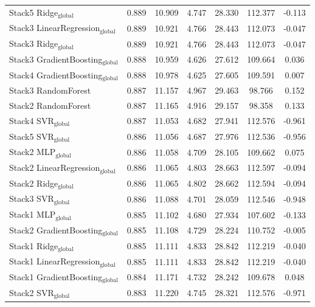 \begin{table}
{\begin{tabular}{p{4.5cm}cccccc}
        Stack5 Ridge$_{\text{global}}$ & 0.889 & 10.909 & 4.747 & 28.330 & 112.377 & -0.113 \\
        Stack3 LinearRegression$_{\text{global}}$ & 0.889 & 10.921 & 4.766 & 28.443 & 112.073 & -0.047 \\
        Stack3 Ridge$_{\text{global}}$ & 0.889 & 10.921 & 4.766 & 28.443 & 112.073 & -0.047 \\
        Stack3 GradientBoosting$_{\text{global}}$ & 0.888 & 10.959 & 4.626 & 27.612 & 109.664 & 0.036 \\
        Stack4 GradientBoosting$_{\text{global}}$ & 0.888 & 10.978 & 4.625 & 27.605 & 109.591 & 0.007 \\
        Stack3 RandomForest & 0.887 & 11.157 & 4.967 & 29.463 & 98.766 & 0.152 \\
        Stack2 RandomForest & 0.887 & 11.165 & 4.916 & 29.157 & 98.358 & 0.133 \\
        Stack4 SVR$_{\text{global}}$ & 0.887 & 11.053 & 4.682 & 27.941 & 112.576 & -0.961 \\
        Stack5 SVR$_{\text{global}}$ & 0.886 & 11.056 & 4.687 & 27.976 & 112.536 & -0.956 \\
        Stack2 MLP$_{\text{global}}$ & 0.886 & 11.058 & 4.709 & 28.105 & 109.662 & 0.075 \\
        Stack2 LinearRegression$_{\text{global}}$ & 0.886 & 11.065 & 4.803 & 28.663 & 112.597 & -0.094 \\
        Stack2 Ridge$_{\text{global}}$ & 0.886 & 11.065 & 4.802 & 28.662 & 112.594 & -0.094 \\
        Stack3 SVR$_{\text{global}}$ & 0.886 & 11.088 & 4.701 & 28.059 & 112.546 & -0.948 \\
        Stack1 MLP$_{\text{global}}$ & 0.885 & 11.102 & 4.680 & 27.934 & 107.602 & -0.133 \\
        Stack2 GradientBoosting$_{\text{global}}$ & 0.885 & 11.108 & 4.729 & 28.224 & 110.752 & -0.005 \\
        Stack1 Ridge$_{\text{global}}$ & 0.885 & 11.111 & 4.833 & 28.842 & 112.219 & -0.040 \\
        Stack1 LinearRegression$_{\text{global}}$ & 0.885 & 11.111 & 4.833 & 28.842 & 112.219 & -0.040 \\
        Stack1 GradientBoosting$_{\text{global}}$ & 0.884 & 11.171 & 4.732 & 28.242 & 109.678 & 0.048 \\
        Stack2 SVR$_{\text{global}}$ & 0.883 & 11.220 & 4.745 & 28.321 & 112.576 & -0.971 \\

\end{tabular}}
\end{table}
